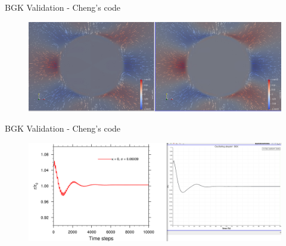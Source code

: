 \documentclass{beamer}
\begin{document}
	\begin{frame}{BGK Validation - Cheng's code}
		\begin{figure}
			\centering
			\includegraphics[scale=0.14]{pics/BGK_VelFieldComparison.png}
		\end{figure}
	\end{frame}
	\begin{frame}{BGK Validation - Cheng's code}
		\begin{figure}
			\centering
			\includegraphics[scale=0.14]{pics/OScDroplet_BGK_Axis.png}
		\end{figure}
	\end{frame}
	
\end{document}
